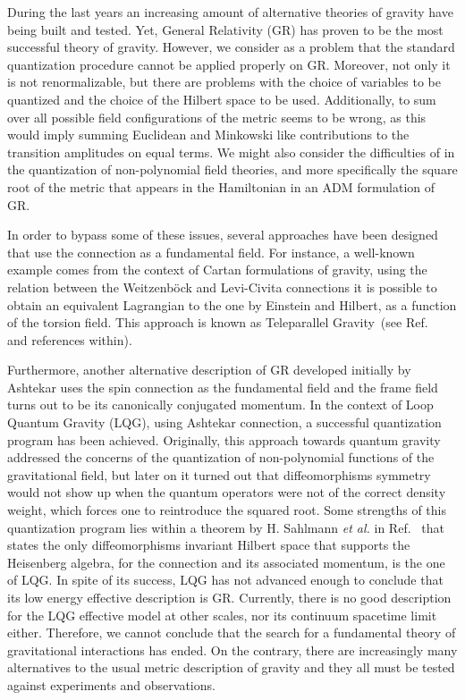 \documentclass{ws-mpla}
\renewcommand{\(}{\left(}
\renewcommand{\)}{\right)}
\renewcommand{\[}{\left[}
\renewcommand{\]}{\right]}
\begin{document}
During the last years an increasing amount of alternative theories of gravity have being built and tested. Yet, General Relativity (GR) has proven to be the most successful theory of gravity.\cite{Berti:2015itd}  However, we consider  as a problem
that the standard quantization procedure cannot be applied  properly on GR. Moreover, not only it is not renormalizable, but there are  problems with the choice of variables to be quantized and the choice of the Hilbert space to be used. Additionally, to sum over all possible field configurations of the metric seems to be wrong, as this would imply summing Euclidean and Minkowski like contributions to the transition amplitudes on equal terms. We might also consider the difficulties of  in the quantization of  non-polynomial field theories, and more specifically the square root of the metric that appears in the Hamiltonian in an ADM formulation of GR.

In order to bypass some of these issues, several approaches have been designed that use the connection as a fundamental field. For instance, a well-known example comes from the context of Cartan formulations of gravity, using the relation between the Weitzenb\"ock and Levi-Civita connections it is possible to obtain an equivalent Lagrangian to the one by Einstein and Hilbert, as a function of the torsion field. This approach is known as Teleparallel Gravity~(see Ref.~ and references within).

Furthermore, another alternative description of GR developed initially by Ashtekar uses the spin connection as the fundamental field and the frame field turns out to be its canonically conjugated momentum. In the context of Loop Quantum Gravity (LQG), using Ashtekar connection, a successful quantization program has been achieved.\cite{Ashtekar:2004eh,thiemann2007loop} Originally, this approach towards quantum gravity addressed the concerns of the quantization of non-polynomial functions of the gravitational field, but later on it turned out that diffeomorphisms symmetry would not show up when the quantum operators were not of the correct density weight, which forces one to reintroduce the squared root.\cite{Thiemann:1996aw}  Some  strengths of this quantization program lies within a theorem by H. Sahlmann \emph{et al.} in Ref.~ that states the only diffeomorphisms invariant Hilbert space that supports the Heisenberg algebra, for the connection and its associated momentum, is the one of LQG. In spite of its success, LQG has not advanced enough to conclude that its low energy effective description is GR. Currently, there is no good description for the LQG effective model at other scales,  nor its continuum spacetime limit either. Therefore, we cannot conclude that the search for a fundamental theory of gravitational interactions has ended. On the contrary, there are increasingly many alternatives to the usual metric description of gravity and they all must be tested against experiments and observations.
\end{document}
